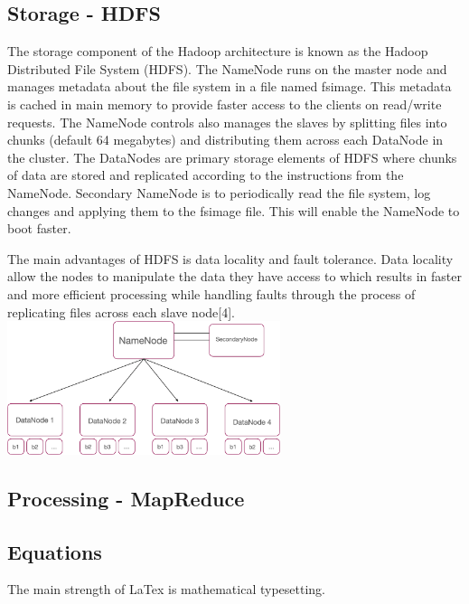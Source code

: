 \documentclass[11pt]{book}
\begin{document}
\subsection{Storage - HDFS}

The storage component of the Hadoop architecture is known as the Hadoop Distributed File System (HDFS). The NameNode runs on the master node and manages metadata about the file system in a file named fsimage. This metadata is cached in main memory to provide faster access to the clients on read/write requests. The NameNode controls also manages the slaves by splitting files into chunks (default 64 megabytes) and distributing them across each DataNode in the cluster. The DataNodes are primary storage elements of HDFS where chunks of data are stored and replicated according to the instructions from the NameNode. Secondary NameNode is to periodically read the file system, log changes and applying them to the fsimage file. This will enable the NameNode to boot faster.

The main advantages of HDFS is data locality and fault tolerance. Data locality allow the nodes to manipulate the data they have access to which results in faster and more efficient processing while handling faults through the process of replicating files across each slave node[4].\\

\includegraphics[width=8cm]{hdfs}

\subsection{Processing - MapReduce}

















\subsection{Equations}
The main strength of LaTex is  mathematical typesetting.  
\end{document}
